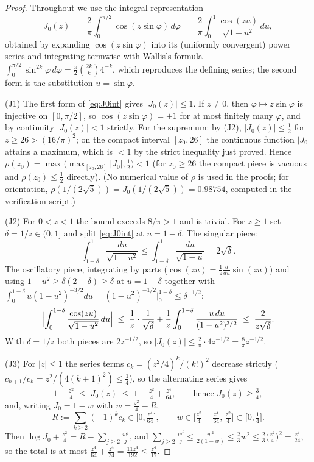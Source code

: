 \documentclass[11pt]{article}
\begin{document}
\begin{proof}
Throughout we use the integral representation
\begin{equation}\label{eq:J0int}
J_0(z)\;=\;\frac2\pi\int_0^{\pi/2}\cos(z\sin\varphi)\,d\varphi
\;=\;\frac2\pi\int_0^1\frac{\cos(zu)}{\sqrt{1-u^2}}\,du ,
\end{equation}
obtained by expanding $\cos(z\sin\varphi)$ into its (uniformly
convergent) power series and integrating termwise with Wallis's
formula $\int_0^{\pi/2}\sin^{2k}\varphi\,d\varphi
=\tfrac\pi2\binom{2k}{k}4^{-k}$, which reproduces the defining series;
the second form is the substitution $u=\sin\varphi$.

(J1) The first form of \eqref{eq:J0int} gives $|J_0(z)|\le1$. If
$z\ne0$, then $\varphi\mapsto z\sin\varphi$ is injective on
$[0,\pi/2]$, so $\cos(z\sin\varphi)=\pm1$ for at most finitely many
$\varphi$, and by continuity $|J_0(z)|<1$ strictly. For the supremum:
by (J2), $|J_0(z)|\le\tfrac12$ for $z\ge26>(16/\pi)^2$; on the compact
interval $[z_0,26]$ the continuous function $|J_0|$ attains a maximum,
which is $<1$ by the strict inequality just proved. Hence
$\rho(z_0)=\max\bigl(\max_{[z_0,26]}|J_0|,\tfrac12\bigr)<1$ (for
$z_0\ge26$ the compact piece is vacuous and $\rho(z_0)\le\tfrac12$
directly). (No
numerical value of $\rho$ is used in the proofs; for orientation,
$\rho(1/(2\sqrt5))=J_0(1/(2\sqrt5))=0.98754$, computed in the
verification script.)

(J2) For $0<z<1$ the bound exceeds $8/\pi>1$ and is trivial. For
$z\ge1$ set $\delta=1/z\in(0,1]$ and split \eqref{eq:J0int} at
$u=1-\delta$. The singular piece:
\[
\int_{1-\delta}^1\frac{du}{\sqrt{1-u^2}}
\le\int_{1-\delta}^1\frac{du}{\sqrt{1-u}}=2\sqrt\delta .
\]
The oscillatory piece, integrating by parts
($\cos(zu)=\tfrac1z\frac{d}{du}\sin(zu)$) and using
$1-u^2\ge\delta(2-\delta)\ge\delta$ at $u=1-\delta$ together with
$\int_0^{1-\delta}u(1-u^2)^{-3/2}du=(1-u^2)^{-1/2}\big|_0^{1-\delta}
\le\delta^{-1/2}$:
\[
\Bigl|\int_0^{1-\delta}\frac{\cos(zu)}{\sqrt{1-u^2}}\,du\Bigr|
\;\le\;\frac1z\cdot\frac1{\sqrt\delta}
+\frac1z\int_0^{1-\delta}\frac{u\,du}{(1-u^2)^{3/2}}
\;\le\;\frac2{z\sqrt\delta} .
\]
With $\delta=1/z$ both pieces are $2z^{-1/2}$, so
$|J_0(z)|\le\tfrac2\pi\cdot4z^{-1/2}=\tfrac8\pi z^{-1/2}$.

(J3) For $|z|\le1$ the series terms $c_k=(z^2/4)^k/(k!)^2$ decrease
strictly ($c_{k+1}/c_k=z^2/(4(k+1)^2)\le\tfrac14$), so the alternating
series gives
\[
1-\tfrac{z^2}4\;\le\;J_0(z)\;\le\;1-\tfrac{z^2}4+\tfrac{z^4}{64},
\qquad\text{hence } J_0(z)\ge\tfrac34,
\]
and, writing $J_0=1-w$ with $w=\tfrac{z^2}4-R$,
\[
R:=\sum_{k\ge2}(-1)^kc_k\in\bigl[0,\tfrac{z^4}{64}\bigr],
\qquad
w\in\bigl[\tfrac{z^2}4-\tfrac{z^4}{64},\,\tfrac{z^2}4\bigr]
\subset\bigl[0,\tfrac14\bigr].
\]
Then $\log J_0+\tfrac{z^2}4=R-\sum_{j\ge2}\tfrac{w^j}j$, and
$\sum_{j\ge2}\tfrac{w^j}j\le\tfrac{w^2}{2(1-w)}\le\tfrac23w^2
\le\tfrac23\bigl(\tfrac{z^2}4\bigr)^2=\tfrac{z^4}{24}$, so the total
is at most $\tfrac{z^4}{64}+\tfrac{z^4}{24}=\tfrac{11z^4}{192}
\le\tfrac{z^4}{17}$.


\end{proof}
\end{document}
